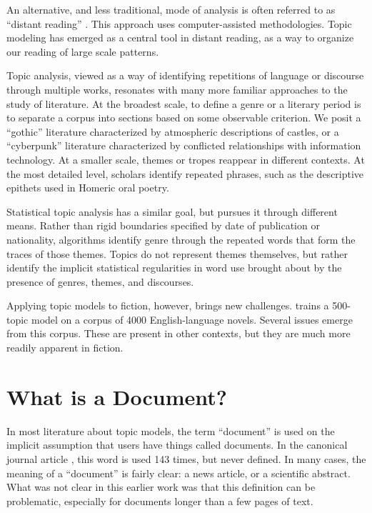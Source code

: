 An alternative, and less traditional, mode of analysis is often referred to as ``distant reading'' \citep{moretti-13}.   This approach uses computer-assisted methodologies. Topic modeling has emerged as a central tool in distant reading, as a way to organize our reading of large scale patterns.

Topic analysis, viewed as a way of identifying repetitions of language or discourse through multiple works, resonates with many more familiar approaches to the study of literature.
At the broadest scale, to define a genre or a literary period is to separate a corpus into sections based on some observable criterion.
We posit a ``gothic'' literature characterized by atmospheric descriptions of castles, or a ``cyberpunk'' literature characterized by conflicted relationships with information technology.
At a smaller scale, themes or tropes reappear in different contexts.
At the most detailed level, scholars identify repeated phrases, such as the descriptive epithets used in Homeric oral poetry.

Statistical topic analysis has a similar goal, but pursues it through different means.
Rather than rigid boundaries specified by date of publication or nationality, algorithms identify genre through the repeated words that form the traces of those themes.
Topics do not represent themes themselves, but rather identify the implicit statistical regularities in word use brought about by the presence of genres, themes, and discourses.

Applying topic models to fiction, however, brings new challenges.  \citet{jockers-13} trains a 500-topic model on a corpus of 4000 English-language novels.
Several issues emerge from this corpus. These are present in other contexts, but they are much more readily apparent in fiction.

\section{What is a Document?}

In most literature about topic models, the term ``document'' is used on the implicit assumption that users have things called documents.
In the canonical  journal article \citep{blei-03}, this word is used 143 times, but never defined.
In many cases, the meaning of a ``document'' is fairly clear: a news article, or a scientific abstract.
What was not clear in this earlier work was that this definition can be problematic, especially for documents longer than a few pages of text.

